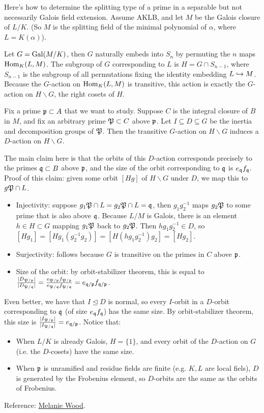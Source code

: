 \documentclass[11pt]{amsart}
\begin{document}
\begin{Rem}
Here's how to determine the splitting type of a prime in a separable but not necessarily Galois field extension. Assume AKLB, and let $M$ be the Galois closure of $L/K$. (So $M$ is the splitting field of the minimal polynomial of $\alpha$, where $L = K(\alpha)$). 

Let $G = \operatorname{Gal}(M/K)$, then $G$ naturally embeds into $S_n$ by permuting the $n$ maps $\operatorname{Hom}_K(L, M)$. The subgroup of $G$ corresponding to $L$ is $H = G\cap S_{n-1}$, where $S_{n-1}$ is the subgroup of all permutations fixing the identity embedding $L\hookrightarrow M$. Because the $G$-action on $\operatorname{Hom}_K(L, M)$ is transitive, this action is exactly the $G$-action on $H\backslash G$, the right cosets of $H$.

Fix a prime $\mathfrak{p}\subset A$ that we want to study. Suppose $C$ is the integral closure of $B$ in $M$, and fix an arbitrary prime $\mathfrak{P} \subset C$ above $\mathfrak{p}$. Let $I \subseteq D \subseteq G$ be the inertia and decomposition groups of $\mathfrak{P}$. Then the transitive $G$-action on $H\backslash G$ induces a $D$-action on $H\backslash G$.

The main claim here is that the orbits of this $D$-action corresponds precisely to the primes $\mathfrak{q}\subset B$ above $\mathfrak{p}$, and the size of the orbit corresponding to $\mathfrak{q}$ is $e_{\mathfrak{q}}f_{\mathfrak{q}}$. Proof of this claim: given some orbit $[Hg]$ of $H\backslash G$ under $D$, we map this to $g\mathfrak{P}\cap L$. 
\begin{itemize}
    \item Injectivity: suppose $g_1\mathfrak{P}\cap L = g_2\mathfrak{P}\cap L = \mathfrak{q}$, then $g_1g_2^{-1}$ maps $g_2\mathfrak{P}$ to some prime that is also above $\mathfrak{q}$. Because $L/M$ is Galois, there is an element $h\in H\subset G$ mapping $g_1\mathfrak{P}$ back to $g_2\mathfrak{P}$. Then $hg_1g_2^{-1} \in D$, so $[Hg_1] = [Hg_1(g_2^{-1}g_2)] = [H(hg_1g_2^{-1})g_2] = [Hg_2]$.
    \item Surjectivity: follows because $G$ is transitive on the primes in $C$ above $\mathfrak{p}$.
    \item Size of the orbit: by orbit-stabilizer theorem, this is equal to $\frac{|D_{\mathfrak{P}/\mathfrak{p}}|}{|D_{\mathfrak{P}/\mathfrak{q}}|} = \frac{e_{\mathfrak{P}/\mathfrak{p}}f_{\mathfrak{P}/\mathfrak{p}}}{e_{\mathfrak{P}/\mathfrak{q}}f_{\mathfrak{P}/\mathfrak{q}}} = e_{\mathfrak{q}/\mathfrak{p}} f_{\mathfrak{q}/\mathfrak{p}}$.
\end{itemize}
Even better, we have that $I\trianglelefteq D$ is normal, so every $I$-orbit in a $D$-orbit corresponding to $\mathfrak{q}$ (of size $e_{\mathfrak{q}}f_{\mathfrak{q}}$) has the same size. By orbit-stabilizer theorem, this size is $\frac{|I_{\mathfrak{P}/\mathfrak{p}}|}{|I_{\mathfrak{P}/\mathfrak{q}}|} = e_{\mathfrak{q}/\mathfrak{p}}$. Notice that:
\begin{itemize}
    \item When $L/K$ is already Galois, $H = \{1\}$, and every orbit of the $D$-action on $G$ (i.e. the $D$-cosets) have the same size.
    \item When $\mathfrak{p}$ is unramified and residue fields are finite (e.g. $K,L$ are local fiels), $D$ is generated by the Frobenius element, so $D$-orbits are the same as the orbits of Frobenius.
\end{itemize}

Reference: \href{https://people.math.harvard.edu/~mmwood/Splitting.pdf}{Melanie Wood}.

\end{Rem}
\end{document}
